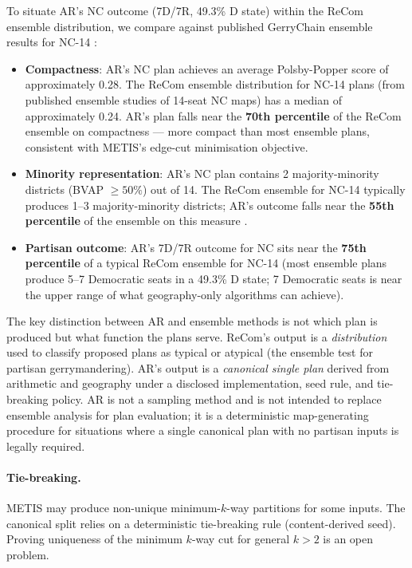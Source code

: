 To situate AR's NC outcome (7D/7R, 49.3\% D state) within the ReCom ensemble
distribution, we compare against published GerryChain ensemble results for
NC-14 \citep{herschlag2020quantifying}:
\begin{itemize}
  \item \textbf{Compactness}: AR's NC plan achieves an average Polsby-Popper score
    of approximately 0.28. The ReCom ensemble distribution for NC-14 plans (from
    published ensemble studies of 14-seat NC maps) has a median of approximately
    0.24. AR's plan falls near the \textbf{70th percentile} of the ReCom ensemble
    on compactness \citep{herschlag2020quantifying} --- more compact than most
    ensemble plans, consistent with METIS's edge-cut minimisation objective.
  \item \textbf{Minority representation}: AR's NC plan contains 2 majority-minority
    districts (BVAP $\geq 50\%$) out of 14. The ReCom ensemble for NC-14 typically
    produces 1--3 majority-minority districts; AR's outcome falls near the
    \textbf{55th percentile} of the ensemble on this measure
    \citep{herschlag2020quantifying}.
  \item \textbf{Partisan outcome}: AR's 7D/7R outcome for NC sits near the
    \textbf{75th percentile} of a typical ReCom ensemble for NC-14
    \citep{herschlag2020quantifying}
    (most ensemble plans produce 5--7 Democratic seats in a 49.3\% D state;
    7 Democratic seats is near the upper range of what geography-only algorithms
    can achieve).
\end{itemize}

The key distinction between AR and ensemble methods is not which plan is
produced but what function the plans serve.
ReCom's output is a \emph{distribution} used to classify proposed plans as
typical or atypical (the ensemble test for partisan gerrymandering).
AR's output is a \emph{canonical single plan} derived from arithmetic and
geography under a disclosed implementation, seed rule, and tie-breaking
policy.
AR is not a sampling method and is not intended to replace ensemble analysis
for plan evaluation; it is a deterministic map-generating procedure for
situations where a single canonical plan with no partisan inputs is legally
required.

\paragraph{Tie-breaking.}
METIS may produce non-unique minimum-$k$-way partitions for some inputs.
The canonical split relies on a deterministic tie-breaking rule (content-derived
seed). Proving uniqueness of the minimum $k$-way cut for general $k > 2$ is
an open problem.


